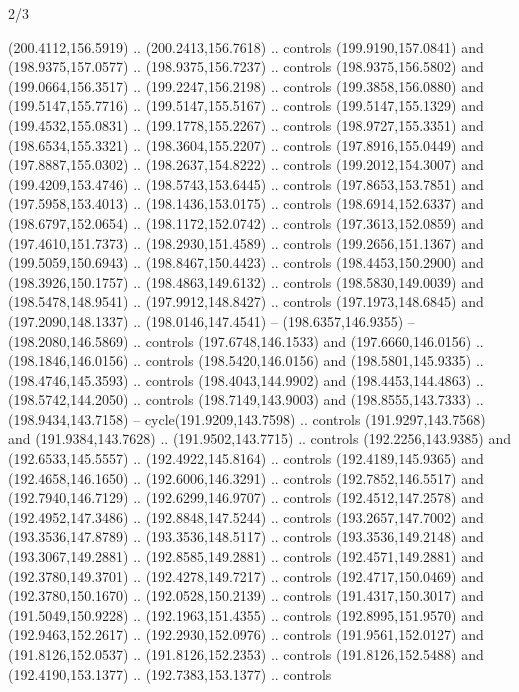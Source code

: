 \begin{flagdescription}{2/3}
\begin{scope}[xshift=0.5\flaglength,yshift=0.5\flagwidth,scale=\flagwidth/180]
\begin{scope}[y=0.8pt, x=0.8pt, yscale=-1,shift={(-168.75,-108.75)}]
  (200.4112,156.5919) .. (200.2413,156.7618) .. controls (199.9190,157.0841) and
  (198.9375,157.0577) .. (198.9375,156.7237) .. controls (198.9375,156.5802) and
  (199.0664,156.3517) .. (199.2247,156.2198) .. controls (199.3858,156.0880) and
  (199.5147,155.7716) .. (199.5147,155.5167) .. controls (199.5147,155.1329) and
  (199.4532,155.0831) .. (199.1778,155.2267) .. controls (198.9727,155.3351) and
  (198.6534,155.3321) .. (198.3604,155.2207) .. controls (197.8916,155.0449) and
  (197.8887,155.0302) .. (198.2637,154.8222) .. controls (199.2012,154.3007) and
  (199.4209,153.4746) .. (198.5743,153.6445) .. controls (197.8653,153.7851) and
  (197.5958,153.4013) .. (198.1436,153.0175) .. controls (198.6914,152.6337) and
  (198.6797,152.0654) .. (198.1172,152.0742) .. controls (197.3613,152.0859) and
  (197.4610,151.7373) .. (198.2930,151.4589) .. controls (199.2656,151.1367) and
  (199.5059,150.6943) .. (198.8467,150.4423) .. controls (198.4453,150.2900) and
  (198.3926,150.1757) .. (198.4863,149.6132) .. controls (198.5830,149.0039) and
  (198.5478,148.9541) .. (197.9912,148.8427) .. controls (197.1973,148.6845) and
  (197.2090,148.1337) .. (198.0146,147.4541) -- (198.6357,146.9355) --
  (198.2080,146.5869) .. controls (197.6748,146.1533) and (197.6660,146.0156) ..
  (198.1846,146.0156) .. controls (198.5420,146.0156) and (198.5801,145.9335) ..
  (198.4746,145.3593) .. controls (198.4043,144.9902) and (198.4453,144.4863) ..
  (198.5742,144.2050) .. controls (198.7149,143.9003) and (198.8555,143.7333) ..
  (198.9434,143.7158) -- cycle(191.9209,143.7598) .. controls
  (191.9297,143.7568) and (191.9384,143.7628) .. (191.9502,143.7715) .. controls
  (192.2256,143.9385) and (192.6533,145.5557) .. (192.4922,145.8164) .. controls
  (192.4189,145.9365) and (192.4658,146.1650) .. (192.6006,146.3291) .. controls
  (192.7852,146.5517) and (192.7940,146.7129) .. (192.6299,146.9707) .. controls
  (192.4512,147.2578) and (192.4952,147.3486) .. (192.8848,147.5244) .. controls
  (193.2657,147.7002) and (193.3536,147.8789) .. (193.3536,148.5117) .. controls
  (193.3536,149.2148) and (193.3067,149.2881) .. (192.8585,149.2881) .. controls
  (192.4571,149.2881) and (192.3780,149.3701) .. (192.4278,149.7217) .. controls
  (192.4717,150.0469) and (192.3780,150.1670) .. (192.0528,150.2139) .. controls
  (191.4317,150.3017) and (191.5049,150.9228) .. (192.1963,151.4355) .. controls
  (192.8995,151.9570) and (192.9463,152.2617) .. (192.2930,152.0976) .. controls
  (191.9561,152.0127) and (191.8126,152.0537) .. (191.8126,152.2353) .. controls
  (191.8126,152.5488) and (192.4190,153.1377) .. (192.7383,153.1377) .. controls

\end{scope}
\end{scope}
\end{flagdescription}
